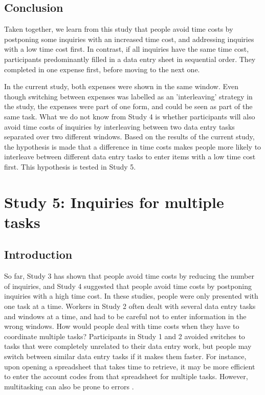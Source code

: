 \subsection{Conclusion}
Taken together, we learn from this study that people avoid time costs by postponing some inquiries with an increased time cost, and addressing inquiries with a low time cost first. In contrast, if all inquiries have the same time cost, participants predominantly filled in a data entry sheet in sequential order. They completed in one expense first, before moving to the next one. 

In the current study, both expenses were shown in the same window. Even though switching between expenses was labelled as an 'interleaving' strategy in the study, the expenses were part of one form, and could be seen as part of the same task. What we do not know from Study 4 is whether participants will also avoid time costs of inquiries by interleaving between two data entry tasks separated over two different windows. Based on the results of the current study, the hypothesis is made that a difference in time costs makes people more likely to interleave between different data entry tasks to enter items with a low time cost first. This hypothesis is tested in Study 5.



\section{Study 5: Inquiries for multiple tasks}
\subsection{Introduction}
So far, Study 3 has shown that people avoid time costs by reducing the number of inquiries, and Study 4 suggested that people avoid time costs by postponing inquiries with a high time cost. In these studies, people were only presented with one task at a time. Workers in Study 2 often dealt with several data entry tasks and windows at a time, and had to be careful not to enter information in the wrong windows. How would people deal with time costs when they have to coordinate multiple tasks? Participants in Study 1 and 2 avoided switches to tasks that were completely unrelated to their data entry work, but people may switch between similar data entry tasks if it makes them faster. For instance, upon opening a spreadsheet that takes time to retrieve, it may be more efficient to enter the account codes from that spreadsheet for multiple tasks. However, multitasking can also be prone to errors \citep{Carrier2015}.


